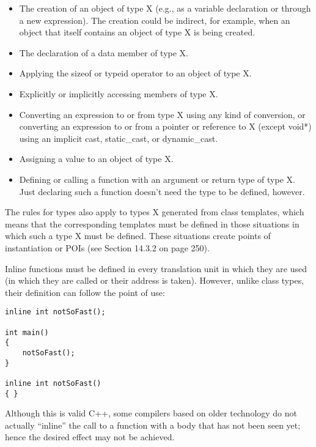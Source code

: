 \begin{itemize}
\item 
The creation of an object of type X (e.g., as a variable declaration or through a new expression). The creation could be indirect, for example, when an object that itself contains an object of type X is being created.

\item 
The declaration of a data member of type X.

\item 
Applying the sizeof or typeid operator to an object of type X.

\item 
Explicitly or implicitly accessing members of type X.

\item 
Converting an expression to or from type X using any kind of conversion, or converting an expression to or from a pointer or reference to X (except void*) using an implicit cast, static\_cast, or dynamic\_cast.

\item 
Assigning a value to an object of type X.

\item 
Defining or calling a function with an argument or return type of type X. Just declaring such a function doesn’t need the type to be defined, however.
\end{itemize}

The rules for types also apply to types X generated from class templates, which means that the corresponding templates must be defined in those situations in which such a type X must be defined. These situations create points of instantiation or POIs (see Section 14.3.2 on page 250).

Inline functions must be defined in every translation unit in which they are used (in which they are called or their address is taken). However, unlike class types, their definition can follow the point of use:

\begin{lstlisting}[style=styleCXX]
inline int notSoFast();

int main()
{
	notSoFast();
}

inline int notSoFast()
{ }
\end{lstlisting}

Although this is valid C++, some compilers based on older technology do not actually “inline” the call to a function with a body that has not been seen yet; hence the desired effect may not be achieved. 

